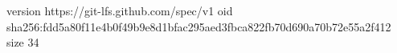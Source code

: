 version https://git-lfs.github.com/spec/v1
oid sha256:fdd5a80f11e4b0f49b9e8d1bfac295aed3fbca822fb70d690a70b72e55a2f412
size 34
